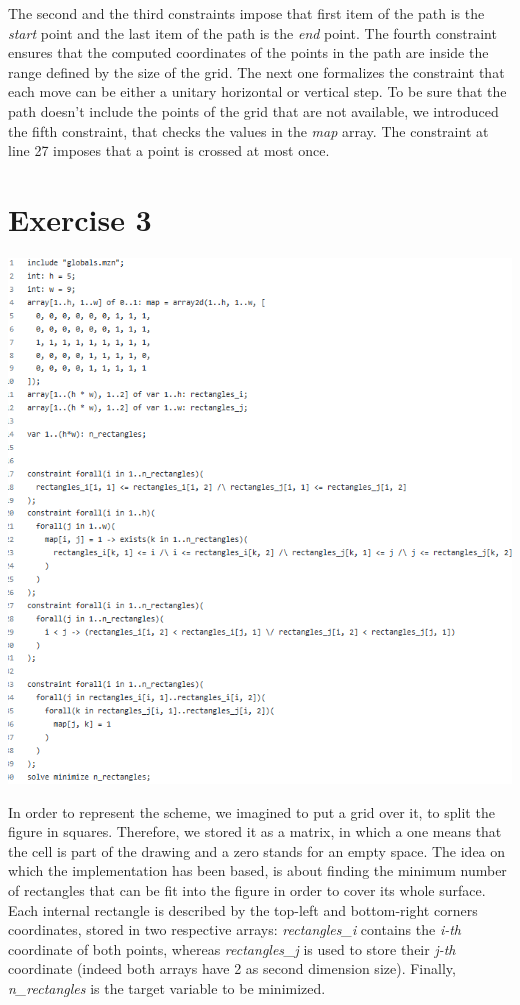 \documentclass{article}
\begin{document}
The second and the third constraints impose that first item of the path is the \textit{start} point and the last item of
the path is the \textit{end} point. 
The fourth constraint ensures that the computed coordinates of the points in the path are inside the range defined
by the size of the grid. The next one formalizes the constraint that each move can be either a unitary horizontal or vertical step.
To be sure that the path doesn't include the points of the grid that are not available, we introduced the fifth constraint,
that checks the values in the \textit{map} array.
The constraint at line 27 imposes that a point is crossed at most once.

\section{Exercise 3}
\vspace{0.2cm}
\includegraphics[width=\linewidth]{img/Es3.png}
\vspace{0.2cm}

In order to represent the scheme, we imagined to put a grid over it, to split
the figure in squares. Therefore, we stored it as a matrix, in which a one means that the cell
is part of the drawing and a zero stands for an empty space.
The idea on which the implementation has been based, is about finding the minimum number of rectangles
that can be fit into the figure in order to cover its whole surface. Each internal rectangle is described
by the top-left and bottom-right corners coordinates, stored in two respective arrays: \textit{rectangles\_i} contains
the \textit{i-th} coordinate of both points, whereas \textit{rectangles\_j} is used to store their \textit{j-th} coordinate
(indeed both arrays have 2 as second dimension size). Finally, \textit{n\_rectangles} is the target variable to be minimized.
\end{document}
